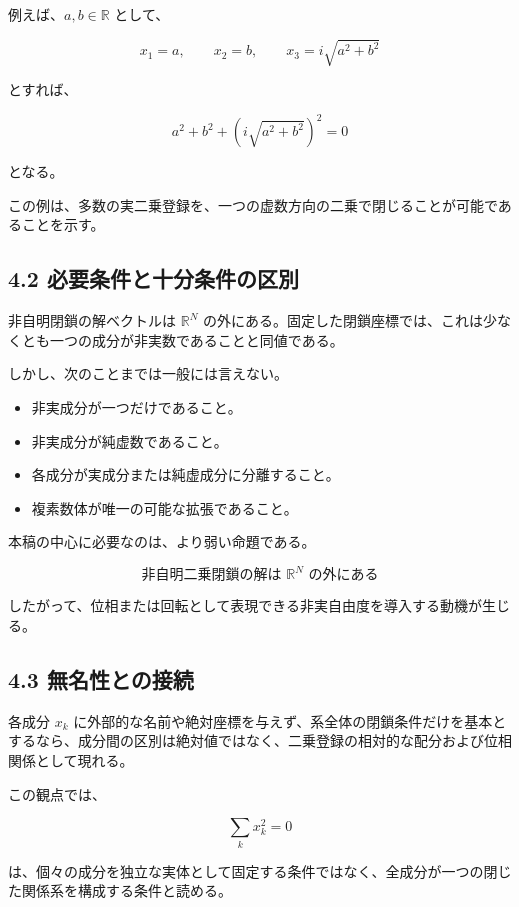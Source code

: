\documentclass[
  a4paper,
  10pt]{article}
\providecommand{\tightlist}{%
  \setlength{\itemsep}{0pt}\setlength{\parskip}{0pt}}
\begin{document}
例えば、\(a,b\in\mathbb R\) として、

\[
x_1=a,
\qquad
x_2=b,
\qquad
x_3=i\sqrt{a^2+b^2}
\]

とすれば、

\[
a^2+b^2+
\left(i\sqrt{a^2+b^2}\right)^2
=0
\]

となる。

この例は、多数の実二乗登録を、一つの虚数方向の二乗で閉じることが可能であることを示す。

\subsection{4.2
必要条件と十分条件の区別}\label{42-ux5fc5ux8981ux6761ux4ef6ux3068ux5341ux5206ux6761ux4ef6ux306eux533aux5225}

非自明閉鎖の解ベクトルは \(\mathbb R^N\)
の外にある。固定した閉鎖座標では、これは少なくとも一つの成分が非実数であることと同値である。

しかし、次のことまでは一般には言えない。

\begin{itemize}
\tightlist
\item
  非実成分が一つだけであること。
\item
  非実成分が純虚数であること。
\item
  各成分が実成分または純虚成分に分離すること。
\item
  複素数体が唯一の可能な拡張であること。
\end{itemize}

本稿の中心に必要なのは、より弱い命題である。

\[
\boxed{
\text{非自明二乗閉鎖の解は }\mathbb R^N\text{ の外にある}
}
\]

したがって、位相または回転として表現できる非実自由度を導入する動機が生じる。

\subsection{4.3
無名性との接続}\label{43-ux7121ux540dux6027ux3068ux306eux63a5ux7d9a}

各成分 \(x_k\)
に外部的な名前や絶対座標を与えず、系全体の閉鎖条件だけを基本とするなら、成分間の区別は絶対値ではなく、二乗登録の相対的な配分および位相関係として現れる。

この観点では、

\[
\sum_kx_k^2=0
\]

は、個々の成分を独立な実体として固定する条件ではなく、全成分が一つの閉じた関係系を構成する条件と読める。
\end{document}
